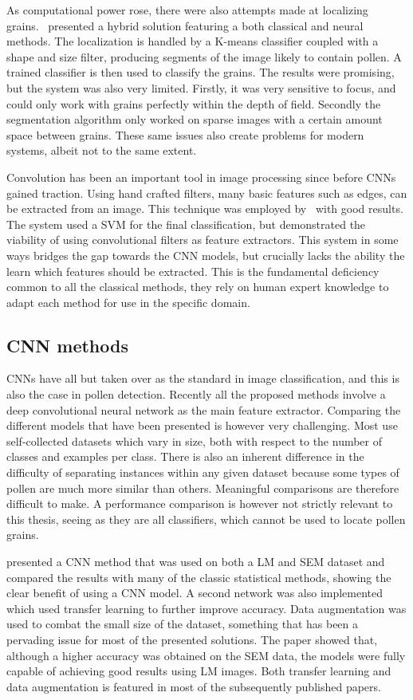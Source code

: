 As computational power rose, there were also attempts made at localizing grains.\ \cite{france_new_2000} presented a hybrid solution featuring a both classical and neural methods.
The localization is handled by a K-means classifier coupled with a shape and size filter, producing segments of the image likely to contain pollen.
A trained classifier is then used to classify the grains.
The results were promising, but the system was also very limited.
Firstly, it was very sensitive to focus, and could only work with grains perfectly within the depth of field.
Secondly the segmentation algorithm only worked on sparse images with a certain amount space between grains.
These same issues also create problems for modern systems, albeit not to the same extent.

Convolution has been an important tool in image processing since before CNNs gained traction.
Using hand crafted filters, many basic features such as edges, can be extracted from an image.
This technique was employed by\ \textcite{DaoodICPR16b} with good results.
The system used a SVM for the final classification, but demonstrated the viability of using convolutional filters as feature extractors.
This system in some ways bridges the gap towards the CNN models, but crucially lacks the ability the learn which features should be extracted.
This is the fundamental deficiency common to all the classical methods, they rely on human expert knowledge to adapt each method for use in the specific domain.

\subsection{CNN methods}
CNNs have all but taken over as the standard in image classification, and this is also the case in pollen detection.
Recently all the proposed methods involve a deep convolutional neural network as the main feature extractor.
Comparing the different models that have been presented is however very challenging.
Most use self-collected datasets which vary in size, both with respect to the number of classes and examples per class.
There is also an inherent difference in the difficulty of separating instances within any given dataset because some types of pollen are much more similar than others.
Meaningful comparisons are therefore difficult to make.
A performance comparison is however not strictly relevant to this thesis, seeing as they are all classifiers, which cannot be used to locate pollen grains.

{\cite{daood_pollen_2016}} presented a CNN method that was used on both a LM and SEM dataset and compared the results with many of the classic statistical methods, showing the clear benefit of using a CNN model.
A second network was also implemented which used transfer learning to further improve accuracy.
Data augmentation was used to combat the small size of the dataset, something that has been a pervading issue for most of the presented solutions.
The paper showed that, although a higher accuracy was obtained on the SEM data, the models were fully capable of achieving good results using LM images.
Both transfer learning and data augmentation is featured in most of the subsequently published papers.

